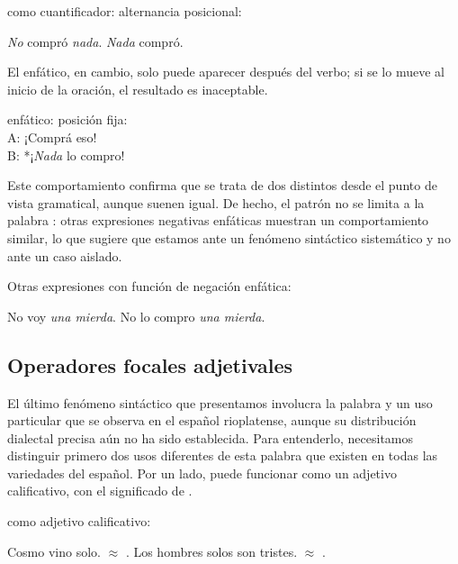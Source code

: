 \begin{exe}
  \ex\label{ex:15-nadacuant}  como cuantificador: alternancia
      posicional:
    \begin{xlist}
      \ex \textit{No} compró \textit{nada}.
      \ex \textit{Nada} compró.
    \end{xlist}
\end{exe}

El  enfático, en cambio, solo puede aparecer después del verbo; si
se lo mueve al inicio de la oración, el resultado es inaceptable.

\begin{exe}
  \ex\label{ex:15-nadafija}  enfático: posición fija:\\
      A: ¡Comprá eso!\\
      B: *¡\textit{Nada} lo compro!
\end{exe}

Este comportamiento confirma que se trata de dos  distintos desde el
punto de vista gramatical, aunque suenen igual. De hecho, el patrón no se limita
a la palabra : otras expresiones negativas enfáticas muestran un
comportamiento similar, lo que sugiere que estamos ante un fenómeno sintáctico
sistemático y no ante un caso aislado.

\begin{exe}
  \ex\label{ex:15-mierda} Otras expresiones con función de negación enfática:
    \begin{xlist}
      \ex No voy \textit{una mierda}.
      \ex No lo compro \textit{una mierda}.
    \end{xlist}
\end{exe}

\subsection{Operadores focales adjetivales}\label{sec:15-solo}

El último fenómeno sintáctico que presentamos involucra la palabra  y
un uso particular que se observa en el español rioplatense, aunque su
distribución dialectal precisa aún no ha sido establecida. Para entenderlo,
necesitamos distinguir primero dos usos diferentes de esta palabra que existen en
todas las variedades del español. Por un lado,  puede funcionar como
un adjetivo calificativo, con el significado de .

\begin{exe}
  \ex\label{ex:15-soloadj}  como adjetivo calificativo:
    \begin{xlist}
      \ex Cosmo vino solo. $\approx$ .
      \ex Los hombres solos son tristes. $\approx$ .
    \end{xlist}
\end{exe}

